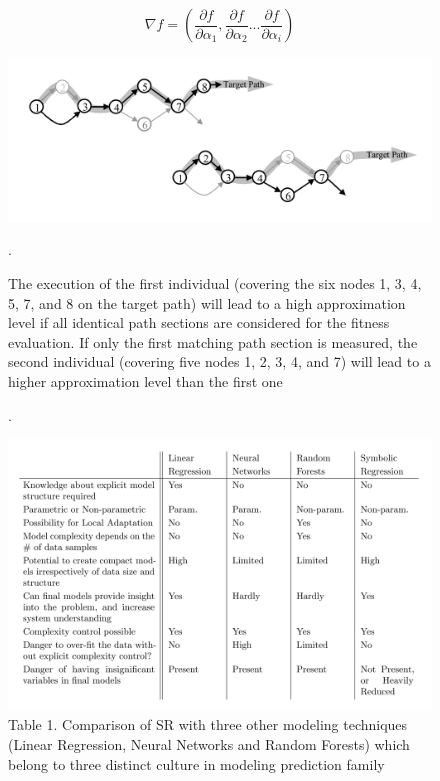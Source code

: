 \documentclass[10pt,journal,compsoc]{IEEEtran}
\begin{document}
\begin{equation} \label{eq:function_derivative}
\nabla f = \left( \frac{\partial f}{\partial \alpha_1},
\frac{\partial f}{\partial \alpha_2}...
\frac{\partial f}{\partial \alpha_i}\right)
\end{equation}



\begin{figure}[tb]
	\centering
	\includegraphics[width=\linewidth,clip]{learning_path.png}
	\vspace{-2em}
	\caption{The
		execution of the first individual (covering the six nodes 1,
		3, 4, 5, 7, and 8 on the target path) will lead to a high
		approximation level if all identical path sections are
		considered for the fitness evaluation. If only the first
		matching path section is measured, the second individual
		(covering five nodes 1, 2, 3, 4, and 7) will lead to a higher
		approximation level than the first one\cite{baresel2002fitness}}.
	\label{fig:learning_path.png}
\end{figure}

\begin{figure}
	\begin{center}
	\captionsetup{labelformat=empty}
	\caption{Table 1. Comparison of SR with three other modeling techniques (Linear Regression, Neural Networks and Random Forests) which belong to three distinct culture in modeling prediction family\cite{VladislavlevaSR}}.
	
	\includegraphics[width=\linewidth]{SR_comparison.png}\end{center}



	\label{Table:SR_comparison}
\end{figure}
\end{document}
